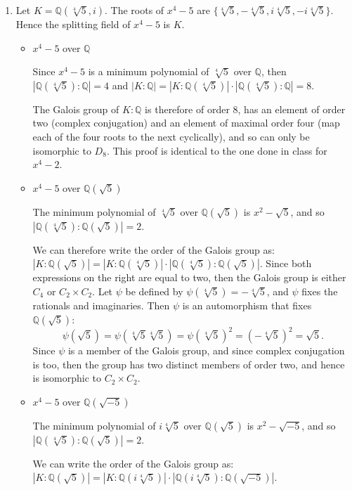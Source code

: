 \documentclass[11pt]{article} \usepackage{amssymb}
\newcommand{\Q}{\mathbb Q}
\begin{document}
\begin{enumerate}
      
  \item
    Let $K=\Q(\sqrt[4]{5}, i)$.
    The roots of $x^4-5$ are 
    $\{\sqrt[4]{5},-\sqrt[4]{5}, i\sqrt[4]{5},-i\sqrt[4]{5}\}$.
    Hence the splitting field of $x^4-5$ is $K$.

    \begin{itemize}
    \item $x^4-5$ over $\Q$

      Since $x^4-5$ is a minimum polynomial of $\sqrt[4]{5}$ over $\Q$, then 
      $|\Q(\sqrt[4]{5}):\Q|=4$ and 
      $|K:\Q|=|K:\Q(\sqrt[4]{5})|\cdot|\Q(\sqrt[4]{5}):\Q|=8$.

      The Galois group of $K:\Q$ is therefore of order 8, has an element of
      order two (complex conjugation) and an element of maximal order four (map
      each of the four roots to the next cyclically), and so can only be 
      isomorphic to $D_8$. This proof is identical to the one done in class
      for $x^4-2$.
      
    \item $x^4-5$ over $\Q(\sqrt{5})$

      The minimum polynomial of $\sqrt[4]{5}$
      over $\Q(\sqrt{5})$ is $x^2-\sqrt{5}$, and so 
      $|\Q(\sqrt[4]{5}):\Q(\sqrt{5})|=2$. 

      We can therefore write the order of the Galois group as:
      $|K:\Q(\sqrt{5})|=|K:\Q(\sqrt[4]{5})|\cdot|\Q(\sqrt[4]{5}):\Q(\sqrt{5})|$.
      Since both expressions on the right are equal to two, then the Galois
      group is either $C_4$ or $C_2\times C_2$. Let $\psi$ be defined by 
      $\psi(\sqrt[4]{5})=-\sqrt[4]{5}$, and $\psi$ fixes the rationals and imaginaries. 
      Then $\psi$ is an automorphism that
      fixes $\Q(\sqrt{5})$:
      \begin{equation*}
        \psi(\sqrt{5})=\psi(\sqrt[4]{5}\sqrt[4]{5})=\psi(\sqrt[4]{5})^2
        = (-\sqrt[4]{5})^2=\sqrt{5}.
      \end{equation*}
      Since $\psi$ is a member of the Galois group, and since complex 
      conjugation is too, then the group has two distinct members of order
      two, and hence is isomorphic to $C_2\times C_2$.

    \item $x^4-5$ over $\Q(\sqrt{-5})$

      The minimum polynomial of $i\sqrt[4]{5}$
      over $\Q(\sqrt{5})$ is $x^2-\sqrt{-5}$, and so 
      $|\Q(\sqrt[4]{5}):\Q(\sqrt{5})|=2$. 

      We can write the order of the Galois group as:
      $|K:\Q(\sqrt{5})|=|K:\Q(i\sqrt[4]{5})|\cdot|\Q(i\sqrt[4]{5}):\Q(\sqrt{-5})|$.
      

\end{itemize}
\end{enumerate}
\end{document}
